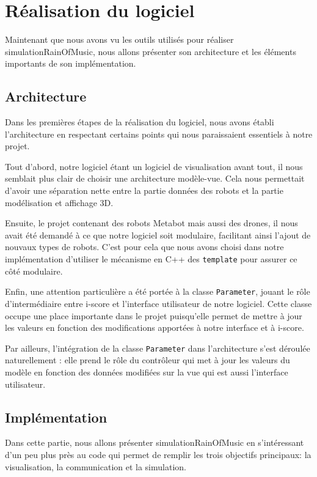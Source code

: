 \section{Réalisation du logiciel}

Maintenant que nous avons vu les outils utilisés pour réaliser simulationRainOfMusic, nous allons présenter son architecture et les éléments importants de son implémentation.

\subsection{Architecture}
Dans les premières étapes de la réalisation du logiciel, nous avons établi l'architecture en respectant certains points qui nous paraissaient essentiels à notre projet.

Tout d'abord, notre logiciel étant un logiciel de visualisation avant tout, il nous semblait plus clair de choisir une architecture modèle-vue. Cela nous permettait d'avoir une séparation nette entre la partie données des robots et la partie modélisation et affichage 3D. 

Ensuite, le projet contenant des robots Metabot mais aussi des drones, il nous avait été demandé à ce que notre logiciel soit modulaire, facilitant ainsi l'ajout de nouvaux types de robots. C'est pour cela que nous avons choisi dans notre implémentation d'utiliser le mécanisme en C++ des \verb|template| pour assurer ce côté modulaire.

Enfin, une attention particulière a été portée à la classe \verb|Parameter|, jouant le rôle d'intermédiaire entre i-score et l'interface utilisateur de notre logiciel. Cette classe occupe une place importante dans le projet puisqu'elle permet de mettre à jour les valeurs en fonction des modifications apportées à notre interface et à i-score.

Par ailleurs, l'intégration de la classe \verb|Parameter| dans l'architecture s'est déroulée naturellement : elle prend le rôle du contrôleur qui met à jour les valeurs du modèle en fonction des données modifiées sur la vue qui est aussi l'interface utilisateur.

		
\subsection{Implémentation}

Dans cette partie, nous allons présenter simulationRainOfMusic en s'intéressant d'un peu plus près au code qui permet de remplir les trois objectifs principaux: la visualisation, la communication et la simulation.

